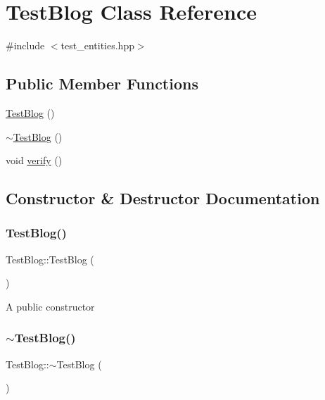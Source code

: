 \hypertarget{class_test_blog}{}\section{Test\+Blog Class Reference}
\label{class_test_blog}


{\ttfamily \#include $<$test\+\_\+entities.\+hpp$>$}

\subsection*{Public Member Functions}
\begin{DoxyCompactItemize}
\item 
\hyperlink{class_test_blog_a63740a7abdb9db8a0b43ec8e9916cd84}{Test\+Blog} ()
\item 
\hyperlink{class_test_blog_ad8e8737a111da9f41f75c6882d645ca4}{$\sim$\+Test\+Blog} ()
\item 
void \hyperlink{class_test_blog_a927d67cdfb5807554fef14270cb927dd}{verify} ()
\end{DoxyCompactItemize}


\subsection{Constructor \& Destructor Documentation}
\mbox{\label{class_test_blog_a63740a7abdb9db8a0b43ec8e9916cd84}} 
\subsubsection{\texorpdfstring{Test\+Blog()}{TestBlog()}}
{\footnotesize\ttfamily Test\+Blog\+::\+Test\+Blog (\begin{DoxyParamCaption}{ }\end{DoxyParamCaption})}

A public constructor \mbox{\label{class_test_blog_ad8e8737a111da9f41f75c6882d645ca4}} 
\subsubsection{\texorpdfstring{$\sim$\+Test\+Blog()}{~TestBlog()}}
{\footnotesize\ttfamily Test\+Blog\+::$\sim$\+Test\+Blog (\begin{DoxyParamCaption}{ }\end{DoxyParamCaption})}

